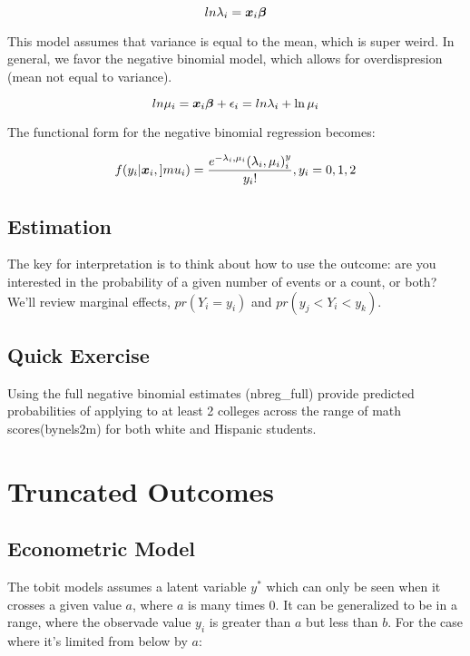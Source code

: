 \documentclass[12 pt]{article}
\begin{document}
\begin{equation}
  \label{eq:2}
  ln \lambda_i=\boldsymbol{x}_i\boldsymbol{\beta}
\end{equation}

This model assumes that variance is equal to the mean, which is super weird. In general, we favor the negative binomial model, which allows for overdispresion (mean not equal to variance). 

\begin{equation}
  \label{eq:3}
  ln \mu_i=\boldsymbol{x}_i\boldsymbol{\beta} +\epsilon_i= ln \lambda_i +\ln \mu_i
\end{equation}

The functional form for the negative binomial regression becomes:

\begin{equation}
  \label{eq:4}
  f(y_i|\boldsymbol{x}_i, ]mu_i)=\frac{e^{-\lambda_i,\mu_i}(\lambda_i,\mu_i)^y_i}{y_i!}, y_i=0,1,2
\end{equation}


\subsection{Estimation}
The key for interpretation is to think about how to use the outcome: are you interested in the probability of a given number of events or a count, or both? We'll review marginal effects, $pr(Y_i=y_i)$ and $pr(y_j<Y_i<y_k)$.

\subsection{Quick Exercise}
\label{sec:quick-exercise}

Using the full negative binomial estimates (nbreg\_full) provide predicted probabilities of applying to at least 2 colleges across the range of math scores(bynels2m) for both white and Hispanic students. 


\section{Truncated Outcomes}

\subsection{Econometric Model}

The tobit models assumes a latent variable $y^*$ which can only be seen when it crosses a given value $a$, where $a$ is many times 0. It can be generalized to be in a range, where the observade value $y_i$ is greater than $a$ but less than $b$. For the case where it's limited from below by $a$:
\end{document}
